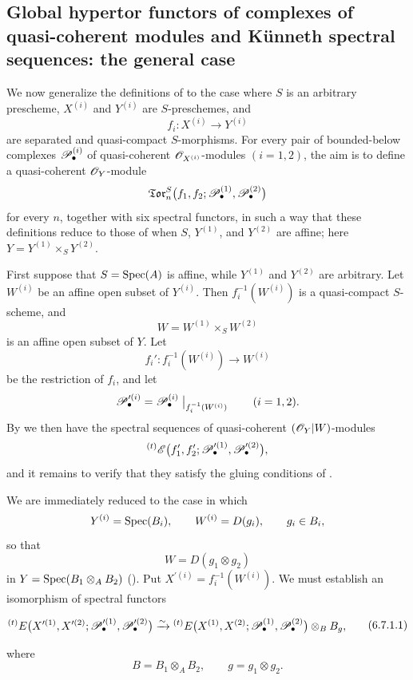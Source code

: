 \subsection{Global hypertor functors of complexes of quasi-coherent modules and K\"unneth spectral sequences: the general case}
\label{subsection:III.6.7}

\begin{env}[6.7.1]
\label{III.6.7.1}
We now generalize the definitions of  to the
case where $S$ is an arbitrary prescheme, $X^{(i)}$ and
$Y^{(i)}$ are $S$-preschemes, and
\[
  f_i:X^{(i)}\longrightarrow Y^{(i)}
\]
are separated and quasi-compact $S$-morphisms.  For every pair
of bounded-below complexes $\mathscr{P}_\bullet^{(i)}$ of
quasi-coherent $\mathscr{O}_{X^{(i)}}$-modules $(i=1,2)$, the aim is to
define a quasi-coherent $\mathscr{O}_Y$-module
\[
  \mathfrak{Tor}_n^S
  \bigl(
    f_1,f_2;
    \mathscr{P}_\bullet^{(1)},\mathscr{P}_\bullet^{(2)}
  \bigr)
\]
for every $n$, together with six spectral functors, in such a way
that these definitions reduce to those of  when
$S$, $Y^{(1)}$, and $Y^{(2)}$ are affine; here
$Y=Y^{(1)}\times_SY^{(2)}$.

First suppose that $S=\operatorname{Spec}(A)$ is affine, while $Y^{(1)}$ and
$Y^{(2)}$ are arbitrary.  Let $W^{(i)}$ be an affine open subset
of $Y^{(i)}$.  Then $f_i^{-1}(W^{(i)})$ is a quasi-compact
$S$-scheme, and
\[
  W=W^{(1)}\times_SW^{(2)}
\]
is an affine open subset of $Y$.  Let
\[
  f_i':f_i^{-1}(W^{(i)})\longrightarrow W^{(i)}
\]
be the restriction of $f_i$, and let
\[
  \mathscr{P}_\bullet^{\prime(i)}
  =
  \mathscr{P}_\bullet^{(i)}
  \bigm|_{f_i^{-1}(W^{(i)})}
  \qquad(i=1,2).
\]
By  we then have the spectral sequences of
quasi-coherent $(\mathscr{O}_Y|W)$-modules
\[
  {}^{(t)}\mathscr{E}
  \bigl(
    f_1',f_2';
    \mathscr{P}_\bullet^{\prime(1)},\mathscr{P}_\bullet^{\prime(2)}
  \bigr),
\]
and it remains to verify that they satisfy the gluing conditions
of .

We are immediately reduced to the case in which
\[
  Y^{(i)}=\operatorname{Spec}(B_i),
  \qquad
  W^{(i)}=D(g_i),
  \qquad g_i\in B_i,
\]
so that
\[
  W=D(g_1\otimes g_2)
\]
in $Y=\operatorname{Spec}(B_1\otimes_AB_2)$
().  Put
$X^{\prime(i)}=f_i^{-1}(W^{(i)})$.  We must establish an
isomorphism of spectral functors
\begin{env}[6.7.1.1]
\label{III.6.7.1.1}
\[
\begin{split}
  {}^{(t)}E
  \bigl(
    X^{\prime(1)},X^{\prime(2)};
    \sh P_\bullet^{\prime(1)},\sh P_\bullet^{\prime(2)}
  \bigr)
  \xrightarrow{\sim}
  {}^{(t)}E
  \bigl(
    X^{(1)},X^{(2)};
    \sh P_\bullet^{(1)},\sh P_\bullet^{(2)}
  \bigr)
  \otimes_BB_g ,
\end{split}
\tag{6.7.1.1}\label{III.6.7.1.1.eq}
\]
\end{env}
where
\[
  B=B_1\otimes_AB_2,
  \qquad
  g=g_1\otimes g_2.
\]


\end{env}
